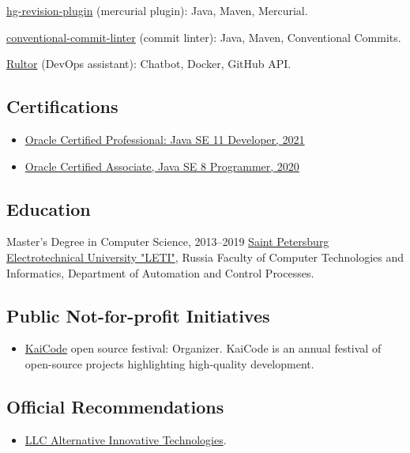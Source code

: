 \documentclass{vl}
\begin{document}
    \href{https://github.com/volodya-lombrozo/hg-revision-plugin}{hg-revision-plugin} (mercurial plugin):
    Java, Maven, Mercurial.

    \href{https://github.com/volodya-lombrozo/conventional-commit-linter}{conventional-commit-linter} (commit linter):
    Java, Maven, Conventional Commits.

    \href{https://www.rultor.com}{Rultor} (DevOps assistant):
    Chatbot, Docker, GitHub API.

    \subsection*{Certifications}

    \begin{itemize}
        \item \href{https://catalog-education.oracle.com/pls/certview/sharebadge?id=87F6A2FE819A5A5AF4120A05900AB28A461EE9A3EE9FBFA02721FADAEB3BCE19}{Oracle Certified Professional: Java SE 11 Developer, 2021}
        \item \href{https://www.credly.com/badges/e2d9ddda-20dc-433d-8ab7-18548fd0fd8f/public_url}{Oracle Certified Associate, Java SE 8 Programmer, 2020}
    \end{itemize}

    \subsection*{Education}

    \begin{samepage}
        Master's Degree in Computer Science, 2013--2019\newline
        \href{https://etu.ru/en/university/}{Saint Petersburg Electrotechnical University "LETI"}, Russia\newline
        Faculty of Computer Technologies and Informatics, Department of Automation and Control Processes.
    \end{samepage}

    \subsection*{Public Not-for-profit Initiatives}
    \begin{itemize}
        \item \href{https://www.kaicode.org}{KaiCode} open source festival: Organizer.
        KaiCode is an annual festival of open-source projects highlighting high-quality development.
    \end{itemize}
    \subsection*{Official Recommendations}
    \begin{itemize}
        \item \href{https://github.com/volodya-lombrozo/volodya-lombrozo.github.io/blob/24eb2bbed8fac71c90ddef6ff4d93de8fb4f9f26/_cv/recommendations/letter_of_recommendation_ait.pdf}{LLC Alternative Innovative Technologies}.
    \end{itemize}
\end{document}
